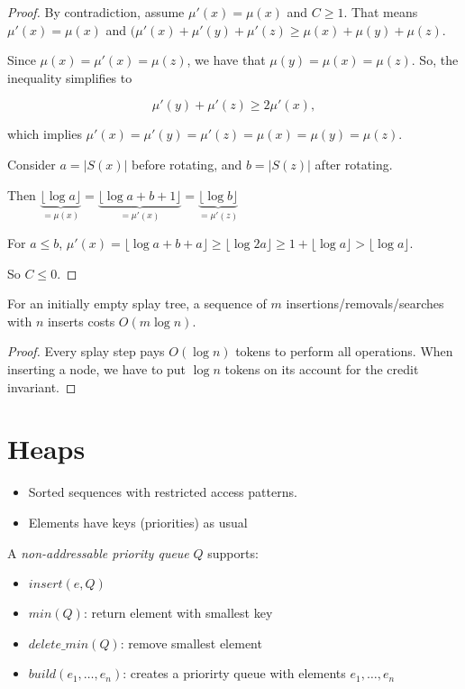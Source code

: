 \begin{proof}
By contradiction, assume $\mu'(x)=\mu(x)$ and $C\ge 1$. That means $\mu'(x)=\mu(x)$ and $(\mu'(x)+\mu'(y)+\mu'(z) \ge \mu(x)+\mu(y)+\mu(z)$.

Since $\mu(x)=\mu'(x)=\mu(z)$, we have that $\mu(y) = \mu(x) = \mu(z)$. So, the inequality simplifies to

$$\mu'(y) + \mu'(z) \ge 2\mu'(x),$$

which implies $\mu'(x) = \mu'(y) = \mu'(z) = \mu(x) = \mu(y) = \mu(z)$.

Consider $a = |S(x)|$ before rotating, and $b = |S(z)|$ after rotating.

Then $\underbrace{\lfloor \log a \rfloor}_{=\mu(x)} = \underbrace{\lfloor\log a + b + 1\rfloor}_{=\mu'(x)} = \underbrace{\lfloor \log b \rfloor}_{=\mu'(z)}$

For $a \le b$, $\mu'(x) = \lfloor \log a + b + a \rfloor \ge \lfloor \log 2a \rfloor \ge 1 + \lfloor \log a \rfloor > \lfloor \log a \rfloor$.

So $C \le 0$.
\end{proof}

\begin{mytheorem}
For an initially empty splay tree, a sequence of $m$ insertions/removals/searches with $n$ inserts costs $O(m \log n)$.
\end{mytheorem}
\begin{proof}
Every splay step pays $O(\log n)$ tokens to perform all operations. When inserting a node, we have to put $\log n$ tokens on its account for the credit invariant.
\end{proof}

\section{Heaps}

\begin{itemize}
\item Sorted sequences with restricted access patterns.
\item Elements have keys (priorities) as usual
\end{itemize}

A \emph{non-addressable priority queue} $Q$ supports:
\begin{itemize}
\item ${insert}(e, Q)$
\item ${min}(Q)$: return element with smallest key
\item ${delete\_min}(Q)$: remove smallest element
\item ${build}(e_1, \ldots, e_n)$: creates a priorirty queue with elements $e_1, \ldots, e_n$
\end{itemize}

